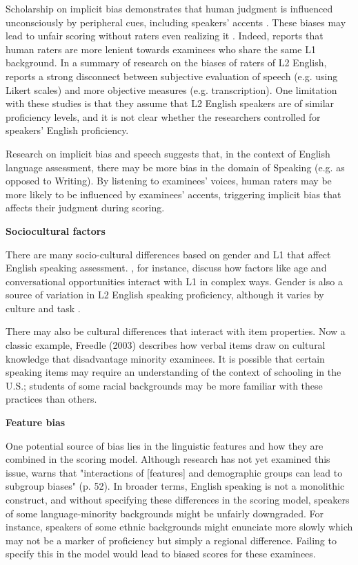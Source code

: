 \documentclass [PhD] {uclathes}
\begin{document}
Scholarship on implicit bias demonstrates that human judgment is influenced unconsciously by peripheral cues, including speakers’ accents \citep{kang2021social}. These biases may lead to unfair scoring without raters even realizing it \citep{greenwald1995}. Indeed, \citet{winke2013} reports that human raters are more lenient towards examinees who share the same L1 background. In a summary of research on the biases of raters of L2 English, \citet{lindemann2013reliably} reports a strong disconnect between subjective evaluation of speech (e.g. using Likert scales) and more objective measures (e.g. transcription). One limitation with these studies is that they assume that L2 English speakers are of similar proficiency levels, and it is not clear whether the researchers controlled for speakers’ English proficiency. 

Research on implicit bias and speech suggests that, in the context of English language assessment, there may be more bias in the domain of Speaking (e.g. as opposed to Writing). By listening to examinees’ voices, human raters may be more likely to be influenced by examinees’ accents, triggering implicit bias that affects their judgment during scoring.

\noindent \textbf{Sociocultural factors} \;

There are many socio-cultural differences based on gender and L1 that affect English speaking assessment. \citet{derwing2013development}, for instance, discuss how factors like age and conversational opportunities interact with L1 in complex ways. Gender is also a source of variation in L2 English speaking proficiency, although it varies by culture and task \citep{denies2022mapping}. 

There may also be cultural differences that interact with item properties. Now a classic example, Freedle (2003) describes how verbal items draw on cultural knowledge that disadvantage minority examinees. It is possible that certain speaking items may require an understanding of the context of schooling in the U.S.; students of some racial backgrounds may be more familiar with these practices than others. 

\noindent \textbf{Feature bias} \;

One potential source of bias lies in the linguistic features and how they are combined in the scoring model. Although research has not yet examined this issue, \citet{zhang2019assessing} warns that "interactions of [features] and demographic groups can lead to subgroup biases" (p. 52). In broader terms, English speaking is not a monolithic construct, and without specifying these differences in the scoring model, speakers of some language-minority backgrounds might be unfairly downgraded. For instance, speakers of some ethnic backgrounds might enunciate more slowly which may not be a marker of proficiency but simply a regional difference. Failing to specify this in the model would lead to biased scores for these examinees.
\end{document}
